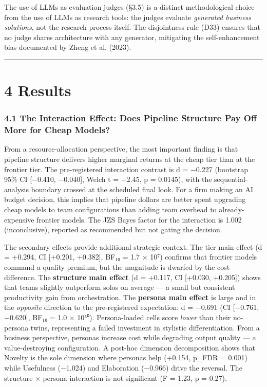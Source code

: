 \documentclass[11pt,a4paper]{article}
\begin{document}
The use of LLMs as evaluation judges (§3.5) is a distinct methodological
choice from the use of LLMs as research tools: the judges evaluate
\textit{generated business solutions}, not the research process itself. The
disjointness rule (D33) ensures that no judge shares architecture with
any generator, mitigating the self-enhancement bias documented by
Zheng et al. (2023).

\hrule


\section{4 Results}

\subsubsection{4.1 The Interaction Effect: Does Pipeline Structure Pay Off More for Cheap Models?}

From a resource-allocation perspective, the most important finding is that
pipeline structure delivers higher marginal returns at the cheap tier than at
the frontier tier. The pre-registered interaction contrast is d = −0.227
(bootstrap 95\% CI [−0.410, −0.040], Welch t = −2.45, p = 0.0145), with the
sequential-analysis boundary crossed at the scheduled final look. For a firm
making an AI budget decision, this implies that pipeline dollars are better
spent upgrading cheap models to team configurations than adding team overhead
to already-expensive frontier models. The JZS Bayes factor for the interaction
is 1.002 (inconclusive), reported as recommended but not gating the decision.

The secondary effects provide additional strategic context. The \textit{}tier
main effect\textit{} (d = +0.294, CI [+0.201, +0.382], BF₁₀ = 1.7 × 10⁷) confirms
that frontier models command a quality premium, but the magnitude is dwarfed
by the cost difference. The \textbf{structure main effect} (d = +0.117, CI
[+0.030, +0.205]) shows that teams slightly outperform solos on average — a
small but consistent productivity gain from orchestration. The \textbf{persona main effect} is large and in the \textit{opposite}
direction to the pre-registered expectation: d = −0.691 (CI [−0.761,
−0.620], BF₁₀ = 1.0 × 10⁵⁰). Persona-loaded cells score \textit{lower} than
their no-persona twins, representing a failed investment in stylistic
differentiation. From a business perspective, personas increase cost while
degrading output quality — a value-destroying configuration. A post-hoc dimension decomposition shows that
Novelty is the sole dimension where personas help (+0.154, p\_FDR =
0.001) while Usefulness (−1.024) and Elaboration (−0.966) drive the
reversal. The structure × persona interaction is not significant (F =
1.23, p = 0.27).
\end{document}
